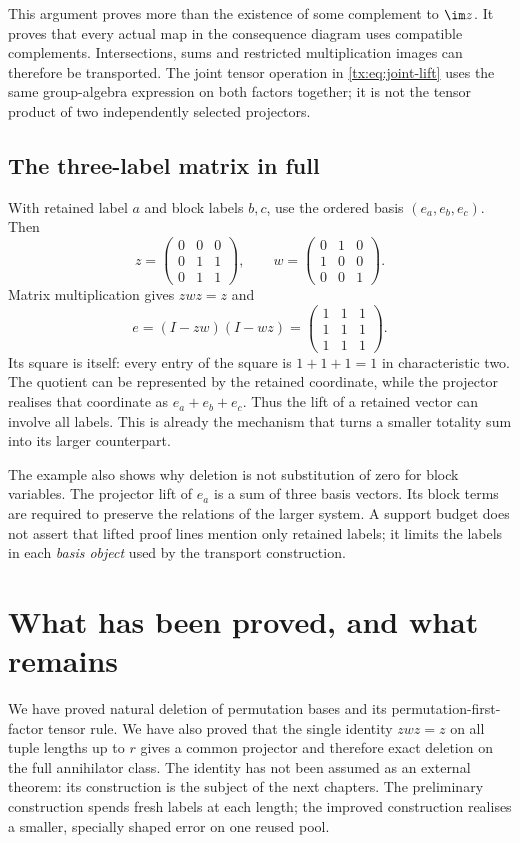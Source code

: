 \documentclass[11pt,a4paper,oneside,openany]{book}
\theoremstyle{definition}\newtheorem{definition}[theorem]{Definition}
\theoremstyle{remark}\newtheorem{remark}[theorem]{Remark}
\numberwithin{equation}{chapter}
\begin{document}
This argument proves more than the existence of some complement to
$\im z$. It proves that every actual map in the consequence diagram
uses compatible complements. Intersections, sums and restricted
multiplication images can therefore be transported. The joint tensor
operation in \eqref{tx:eq:joint-lift} uses the same group-algebra
expression on both factors together; it is not the tensor product
of two independently selected projectors.

\subsection{The three-label matrix in full}
With retained label $a$ and block labels $b,c$, use the ordered basis
$(e_a,e_b,e_c)$. Then
\[
 z=\begin{pmatrix}0&0&0\\0&1&1\\0&1&1\end{pmatrix},\qquad
 w=\begin{pmatrix}0&1&0\\1&0&0\\0&0&1\end{pmatrix}.
\]
Matrix multiplication gives $zwz=z$ and
\[
 e=(I-zw)(I-wz)=
       \begin{pmatrix}1&1&1\\1&1&1\\1&1&1\end{pmatrix}.
\]
Its square is itself: every entry of the square is $1+1+1=1$ in
characteristic two. The quotient can be represented by the retained
coordinate, while the projector realises that coordinate as
$e_a+e_b+e_c$. Thus the lift of a retained vector can involve all
labels. This is already the mechanism that turns a smaller totality
sum into its larger counterpart.

The example also shows why deletion is not substitution of zero for
block variables. The projector lift of $e_a$ is a sum of three basis
vectors. Its block terms are required to preserve the relations of
the larger system. A support budget does not assert that lifted proof
lines mention only retained labels; it limits the labels in each
\emph{basis object} used by the transport construction.

\section*{What has been proved, and what remains}
We have proved natural deletion of permutation bases and its
permutation-first-factor tensor rule. We have also proved that the
single identity $zwz=z$ on all tuple lengths up to $r$ gives a common
projector and therefore exact deletion on the full annihilator class.
The identity has not been assumed as an external theorem: its
construction is the subject of the next chapters. The preliminary
construction spends fresh labels at each length; the improved
construction realises a smaller, specially shaped error on one reused
pool.
\end{document}
